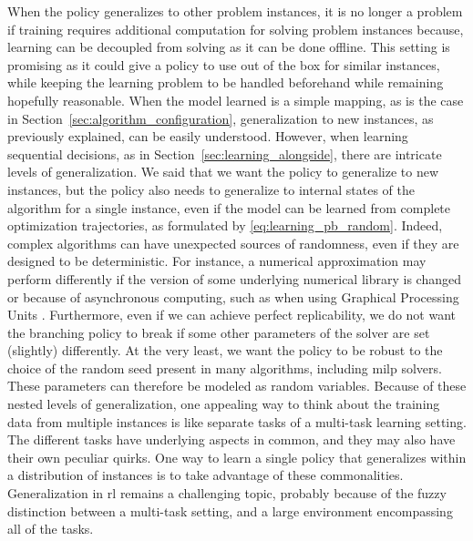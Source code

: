 \documentclass[11pt]{article}
\begin{document}
		When the policy generalizes to other problem instances, it is no longer a problem if training
		requires additional computation for solving problem instances because, learning can be decoupled
		from solving as it can be done offline.
		This setting is promising as it could give a policy to use out of the box for similar instances,
		while keeping the learning problem to be handled beforehand while remaining hopefully reasonable.
		When the model learned is a simple mapping, as is the case in
		Section~\ref{sec:algorithm_configuration}, generalization to new instances, as previously
		explained, can be easily understood.
		However, when learning sequential decisions, as in Section~\ref{sec:learning_alongside}, there are
		intricate levels of generalization.
		We said that we want the policy to generalize to new instances, but the policy also needs to
		generalize to internal states of the algorithm for a single instance, even if the model can be
		learned from complete optimization trajectories, as formulated by
		\eqref{eq:learning_pb_random}.
		Indeed, complex algorithms can have unexpected sources of randomness, even if they are designed to
		be deterministic.
		For instance, a numerical approximation may perform differently if the version of some underlying
		numerical library is changed or because of asynchronous computing, such as when using Graphical
		Processing Units \citep{NagarajanDeterministic2019}.
		Furthermore, even if we can achieve perfect replicability, we do not want the branching
		policy to break if some other parameters of the solver are set (slightly) differently.
		At the very least, we want the policy to be robust to the choice of the random seed present in many
		algorithms, including \gls{milp} solvers.
		These parameters can therefore be modeled as random variables.
		Because of these nested levels of generalization, one appealing way to think about the training data
		from multiple instances is like separate tasks of a multi-task learning setting.
		The different tasks have underlying aspects in common, and they may also have their own peculiar
		quirks.
		One way to learn a single policy that generalizes within a distribution of instances is to take
		advantage of these commonalities.
		Generalization in \gls{rl} remains a challenging topic, probably because of the fuzzy distinction
		between a multi-task setting, and a large environment encompassing all of the tasks.
\end{document}
